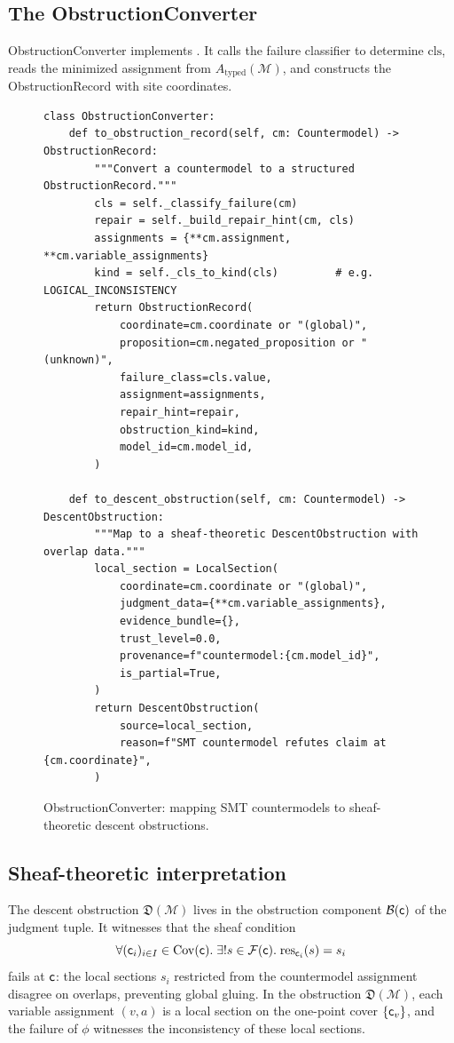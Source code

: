\documentclass[11pt]{article}
\newcommand{\CMod}{\mathcal{M}}            %
\newcommand{\DO}{\mathfrak{D}}             %
\begin{document}
\subsection{The ObstructionConverter}

\textsf{ObstructionConverter} implements .  It
calls the failure classifier to determine $\mathrm{cls}$, reads the
minimized assignment from $A_{\mathrm{typed}}(\CMod)$, and constructs
the \textsf{ObstructionRecord} with site coordinates.

\begin{figure}[ht]
\begin{lstlisting}[style=jugeo-python]
class ObstructionConverter:
    def to_obstruction_record(self, cm: Countermodel) -> ObstructionRecord:
        """Convert a countermodel to a structured ObstructionRecord."""
        cls = self._classify_failure(cm)
        repair = self._build_repair_hint(cm, cls)
        assignments = {**cm.assignment, **cm.variable_assignments}
        kind = self._cls_to_kind(cls)         # e.g. LOGICAL_INCONSISTENCY
        return ObstructionRecord(
            coordinate=cm.coordinate or "(global)",
            proposition=cm.negated_proposition or "(unknown)",
            failure_class=cls.value,
            assignment=assignments,
            repair_hint=repair,
            obstruction_kind=kind,
            model_id=cm.model_id,
        )

    def to_descent_obstruction(self, cm: Countermodel) -> DescentObstruction:
        """Map to a sheaf-theoretic DescentObstruction with overlap data."""
        local_section = LocalSection(
            coordinate=cm.coordinate or "(global)",
            judgment_data={**cm.variable_assignments},
            evidence_bundle={},
            trust_level=0.0,
            provenance=f"countermodel:{cm.model_id}",
            is_partial=True,
        )
        return DescentObstruction(
            source=local_section,
            reason=f"SMT countermodel refutes claim at {cm.coordinate}",
        )
\end{lstlisting}
\caption{\textsf{ObstructionConverter}: mapping SMT countermodels to
         sheaf-theoretic descent obstructions.}
\label{fig:oc}
\end{figure}

\subsection{Sheaf-theoretic interpretation}

The descent obstruction $\DO(\CMod)$ lives in the obstruction component
$\mathcal{B}(\mathsf{c})$ of the judgment tuple.  It witnesses that the sheaf
condition
\[
  \forall (\mathsf{c}_i)_{i \in I} \in \mathrm{Cov}(\mathsf{c}).\;
  \exists! s \in \mathcal{F}(\mathsf{c}).\;
  \mathrm{res}_{\mathsf{c}_i}(s) = s_i
\]
fails at $\mathsf{c}$: the local sections $s_i$ restricted from the
countermodel assignment disagree on overlaps, preventing global gluing.
In the obstruction $\DO(\CMod)$, each variable assignment $(v, a)$ is a
local section on the one-point cover $\{\mathsf{c}_v\}$, and the failure
of $\phi$ witnesses the inconsistency of these local sections.
\end{document}
